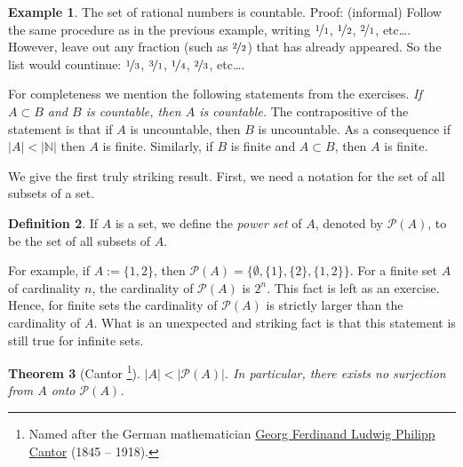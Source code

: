\documentclass[12pt]{book}
\newcommand{\abs}[1]{\left\lvert {#1} \right\rvert}
\newcommand{\N}{{\mathbb{N}}}
\newcommand{\sP}{{\mathcal{P}}}
\newcommand{\myindex}[1]{#1\index{#1}}
\theoremstyle{plain}
\newtheorem{thm}{Theorem}[section]
\theoremstyle{remark}
\theoremstyle{definition}
\newtheorem{defn}[thm]{Definition}
\theoremstyle{exercise}
\theoremstyle{example}
\newtheorem{example}[thm]{Example}
\begin{document}
\begin{example}
The set of rational numbers is countable.  Proof: (informal)
Follow the same procedure
as in the previous example, writing
$\nicefrac{1}{1}$, $\nicefrac{1}{2}$, $\nicefrac{2}{1}$, etc\ldots.  However,
leave out any fraction (such as $\nicefrac{2}{2}$)
that has already appeared.  So the list would countinue:
$\nicefrac{1}{3}$, $\nicefrac{3}{1}$, $\nicefrac{1}{4}$,
$\nicefrac{2}{3}$, etc\ldots.
\end{example}

For completeness we mention the following statements
from the exercises.
\emph{If $A \subset
B$ and $B$ is countable, then $A$ is countable.}  The contrapositive of the
statement is that if $A$ is
uncountable, then $B$ is uncountable.
As a consequence if $\abs{A} < \abs{\N}$ then $A$ is
finite.
Similarly, if $B$ is finite and $A \subset B$, then $A$ is finite.

We give the first truly striking result.  First, we need a notation for
the set of all subsets of a set.

\begin{defn}
If $A$ is a set,
we define the \emph{\myindex{power set}} of $A$, denoted by $\sP(A)$, to be
the set of all subsets of $A$.
\end{defn}

For example, if $A := \{ 1,2\}$,
then $\sP(A) = \bigl\{ \emptyset, \{ 1 \}, \{ 2 \}, \{ 1, 2 \} \bigr\}$.
For a finite set $A$ of cardinality $n$, the
cardinality of $\sP(A)$ is $2^n$.  This fact is left as an exercise.  
Hence, for finite sets
the cardinality of $\sP(A)$ is strictly
larger than the
cardinality of $A$.  What is an unexpected and
striking fact is that this statement is still true for infinite sets.

\begin{thm}[Cantor%
\footnote{Named after the German mathematician
\href{http://en.wikipedia.org/wiki/Georg_Cantor}{Georg Ferdinand Ludwig
Philipp Cantor} (1845 -- 1918).}]
\label{cantorspowersetthm}
$\abs{A} < \abs{\sP(A)}$.  In particular, there exists no surjection from
$A$ onto $\sP(A)$.
\end{thm}
\end{document}
